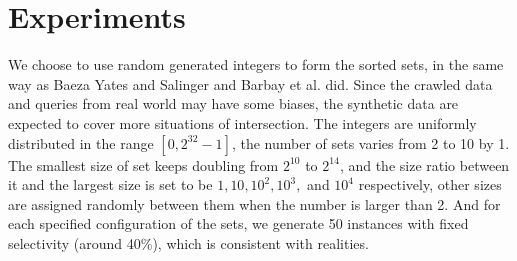 \section{Experiments}
We choose to use random generated integers to form the sorted sets, in the same way as Baeza Yates and Salinger \cite{Baezayates2005Experimental} and Barbay et al. \cite{barbay2009experimental} did.
Since the crawled data and queries from real world may have some biases, the synthetic data are expected to cover more situations of intersection.
The integers are uniformly distributed in the range $ [0,2^{32}-1] $, the number of sets varies from 2 to 10 by 1.
The smallest size of set keeps doubling from $ 2^{10} $ to $ 2^{14} $, and the size ratio between it and the largest size is set to be $ 1, 10, 10^2, 10^3,$ and $ 10^4 $ respectively, other sizes are assigned randomly between them when the number is larger than 2.
And for each specified configuration of the sets, we generate 50 instances with fixed selectivity (around 40\%), which is consistent with realities.
%

